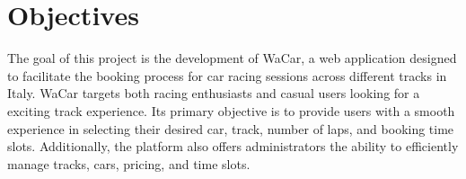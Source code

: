 \section{Objectives}

The goal of this project is the development of WaCar, a web application designed to facilitate the booking process for car racing sessions across different tracks in Italy.
WaCar targets both racing enthusiasts and casual users looking for a exciting track experience.
Its primary objective is to provide users with a smooth experience in selecting their desired car, track, number of laps, and booking time slots.
Additionally, the platform also offers administrators the ability to efficiently manage tracks, cars, pricing, and time slots.